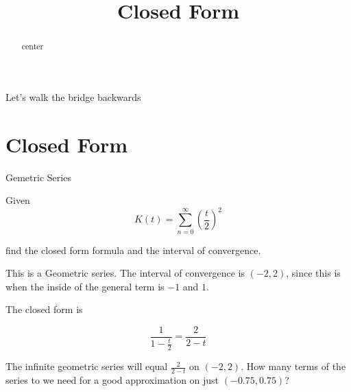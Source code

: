 \documentclass{ximera}
\title{Closed Form}
\begin{document}
\begin{abstract}
center
\end{abstract}
\maketitle






Let's walk the bridge backwards



\section*{Closed Form}



\begin{example} Gemetric Series


Given 
\[    K(t) =   \sum_{n=0}^{\infty}  \left( \frac{t}{2} \right)^2\]

find the closed form formula and the interval of convergence.




\begin{explanation}


This is a Geometric series.  The interval of convergence is $(-2, 2)$, since this is when the inside of the general term is $-1$ and $1$.


The closed form is

\[  \frac{1}{1 - \frac{t}{2}}  =     \frac{2}{2-t}           \]



\end{explanation}


\end{example}




The infinite geometric series will equal $\frac{2}{2-t}$ on $(-2, 2)$.  How many terms of the series to we need for a good approximation on just $(-0.75, 0.75)$?



\begin{center}
\end{center}
\end{document}
